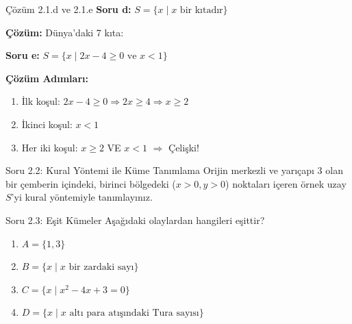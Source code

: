 \documentclass[light]{lutbeamer}
\begin{document}
\begin{frame}{Çözüm 2.1.d ve 2.1.e}
    \color{blue}
    \textbf{Soru d:} $S = \{x \mid x \text{ bir kıtadır}\}$
    
    \textbf{Çözüm:} Dünya'daki 7 kıta:
    \begin{center}
    \end{center}
    
    \vspace{0.5cm}
    \textbf{Soru e:} $S = \{x \mid 2x - 4 \geq 0 \text{ ve } x < 1\}$
    
    \textbf{Çözüm Adımları:}
    \begin{enumerate}
        \item İlk koşul: $2x - 4 \geq 0 \Rightarrow 2x \geq 4 \Rightarrow x \geq 2$
        \item İkinci koşul: $x < 1$
        \item Her iki koşul: $x \geq 2$ VE $x < 1$ $\Rightarrow$ Çelişki!
    \end{enumerate}
    
    \begin{center}
    \end{center}
\end{frame}

\begin{frame}{Soru 2.2: Kural Yöntemi ile Küme Tanımlama}
    Orijin merkezli ve yarıçapı 3 olan bir çemberin içindeki, birinci bölgedeki ($x>0, y>0$) noktaları içeren örnek uzay $S$'yi kural yöntemiyle tanımlayınız.
    
\end{frame}

\begin{frame}{Soru 2.3: Eşit Kümeler}
    Aşağıdaki olaylardan hangileri eşittir?
    \begin{enumerate}
        \item $A = \{1, 3\}$
        \item $B = \{x \mid x \text{ bir zardaki sayı}\}$
        \item $C = \{x \mid x^2 - 4x + 3 = 0\}$
        \item $D = \{x \mid x \text{ altı para atışındaki Tura sayısı}\}$
    \end{enumerate}
\end{frame}
\end{document}
